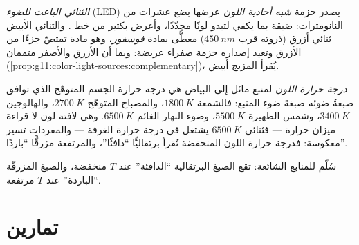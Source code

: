 \begin{definition}\label{def:g11:color-light-sources:led}
\emph{الثنائي الباعث للضوء} (LED) يصدر حزمة
\emph{شبه أحادية اللون} عرضها بضع عشرات من النانومترات: ضيقة
بما يكفي لتبدو لونًا محدّدًا، وأعرض بكثير من خط . والثنائي
الأبيض ثنائي أزرق (ذروته قرب $\qty{450}{nm}$) مغطًّى
بمادة \emph{فوسفور}، وهو مادة تمتصّ جزءًا من الأزرق
وتعيد إصداره حزمة صفراء عريضة: وبما أن الأزرق والأصفر
متممان (\cref{prop:g11:color-light-sources:complementary})، يُقرأ
المزيج أبيض.
\end{definition}

\begin{definition}\label{def:g11:color-light-sources:colortemp}
\emph{درجة حرارة اللون} لمنبع مائل
إلى البياض هي درجة حرارة الجسم المتوهّج الذي توافق صبغةُ ضوئه صبغةَ
ضوء المنبع: فالشمعة $\qty{1800}{K}$، والمصباح المتوهّج $\qty{2700}{K}$،
والهالوجين $\qty{3400}{K}$، وشمس الظهيرة $\qty{5500}{K}$، وضوء النهار الغائم
$\qty{6500}{K}$. وهي لافتة لون لا قراءة ميزان حرارة --- فثنائي
$\qty{6500}{K}$ يشتغل في درجة حرارة الغرفة --- والمفردات تسير
معكوسة: فدرجة حرارة اللون المنخفضة تُقرأ برتقاليًّا ``دافئًا''، والمرتفعة
مزرقًّا ``باردًا''.
\end{definition}

\begin{omfigure}

{\small سُلّم  للمنابع الشائعة: تقع الصبغ البرتقالية
``الدافئة'' عند $T$ منخفضة، والصبغ المزرقّة ``الباردة'' عند $T$ مرتفعة.}
\end{omfigure}

\section{تمارين}

